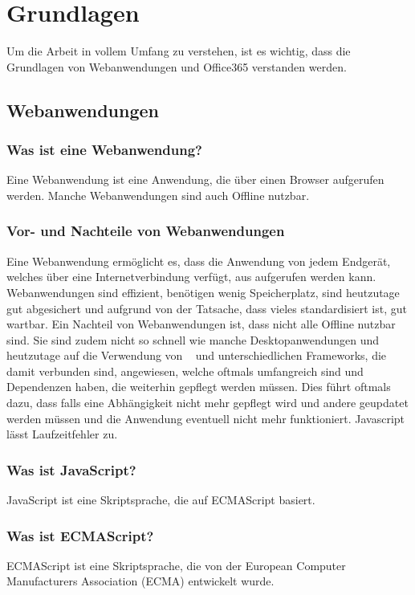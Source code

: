 
\section{Grundlagen}\label{sec:grundlagen}
Um die Arbeit in vollem Umfang zu verstehen, ist es wichtig, dass die Grundlagen von Webanwendungen und Office365 verstanden werden.
\subsection{Webanwendungen}\label{subsec:webanwendungen}

\subsubsection{Was ist eine Webanwendung?}
Eine Webanwendung ist eine Anwendung, die über einen Browser aufgerufen werden.
Manche Webanwendungen sind auch Offline nutzbar.
\subsubsection{Vor- und Nachteile von Webanwendungen}
Eine Webanwendung ermöglicht es, dass die Anwendung von jedem Endgerät, welches über eine Internetverbindung verfügt, aus aufgerufen werden kann.
Webanwendungen sind effizient, benötigen wenig Speicherplatz, sind heutzutage gut abgesichert und aufgrund von der Tatsache, dass vieles standardisiert ist, gut wartbar.
\newline
\newline
Ein Nachteil von Webanwendungen ist, dass nicht alle Offline nutzbar sind.
Sie sind zudem nicht so schnell wie manche Desktopanwendungen und heutzutage auf die Verwendung von ~\cite{JavaScript} und unterschiedlichen Frameworks, die damit verbunden sind, angewiesen, welche oftmals umfangreich sind und Dependenzen haben, die weiterhin gepflegt werden müssen.
Dies führt oftmals dazu, dass falls eine Abhängigkeit nicht mehr gepflegt wird und andere geupdatet werden müssen und die Anwendung eventuell nicht mehr funktioniert.
Javascript lässt Laufzeitfehler zu.
\subsubsection{Was ist JavaScript?}
JavaScript ist eine Skriptsprache, die auf ECMAScript basiert.
\subsubsection{Was ist ECMAScript?}
ECMAScript ist eine Skriptsprache, die von der European Computer Manufacturers Association (ECMA) entwickelt wurde.
